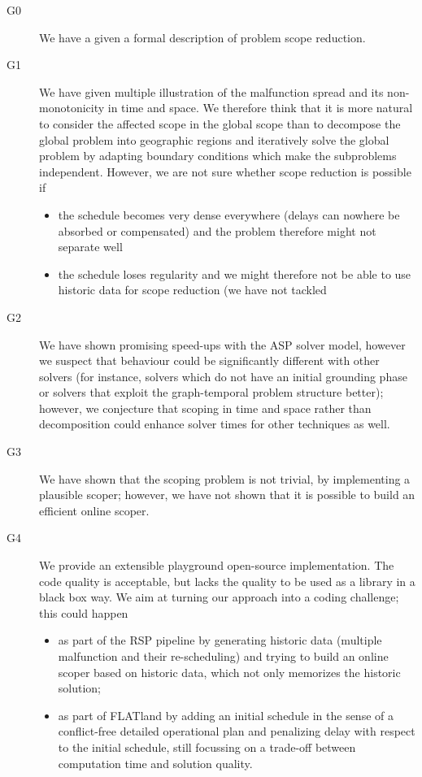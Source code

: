 \documentclass{article}
\begin{document}
\begin{description}
\item[G0] We have a given a formal description of problem scope reduction.
\item[G1] We have given multiple illustration of the malfunction spread and its non-monotonicity in time and space. We therefore think that it is more natural to consider the affected scope in the global scope than to decompose the global problem into geographic regions and iteratively solve the global problem by adapting boundary conditions which make the subproblems independent.
However, we are not sure whether scope reduction is possible if
    \begin{itemize}
        \item the schedule becomes very dense everywhere (delays can nowhere be absorbed or compensated) and the problem therefore might not separate well
        \item the schedule loses regularity and we might therefore not be able to use historic data for scope reduction (we have not tackled
    \end{itemize}
\item[G2] We have shown promising speed-ups with the ASP solver model, however we suspect that behaviour could be significantly different with other solvers (for instance, solvers which do not have an initial grounding phase or solvers that exploit the graph-temporal problem structure better); however, we conjecture that scoping in time and space rather than decomposition could enhance solver times for other techniques as well.
\item[G3] We have shown that the scoping problem is not trivial, by implementing a plausible scoper; however, we have not shown that it is possible to build an efficient online scoper.
\item[G4] We provide an extensible playground open-source implementation. The code quality is acceptable, but lacks the quality to be used as a library in a black box way. We aim at turning our approach into a coding challenge; this could happen
\begin{itemize}
\item as part of the RSP pipeline by generating historic data (multiple malfunction and their re-scheduling) and trying to build an online scoper based on historic data, which not only memorizes the historic solution;
\item as part of FLATland by adding an initial schedule in the sense of a conflict-free detailed operational plan and penalizing delay with respect to the initial schedule, still focussing on a trade-off between computation time and solution quality.
\end{itemize}

\end{description}
\end{document}
